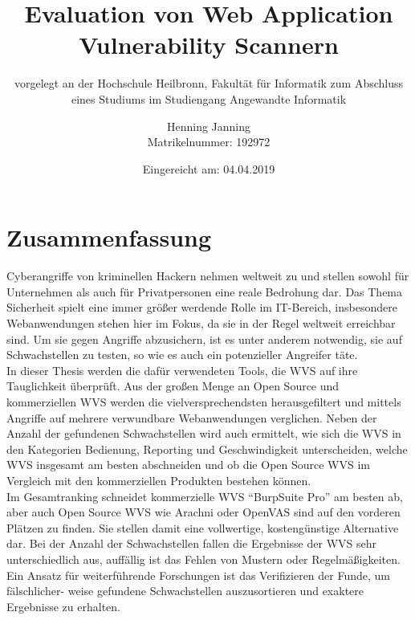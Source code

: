 \documentclass[12pt,oneside,a4paper,parskip,pointlessnumbers]{scrbook}
\def\BaAuthor{Henning Janning}
\def\BaTitle{Evaluation von Web Application Vulnerability Scannern}
\def\BaSupervisorOne{Prof. Dr.-Ing. Andreas Mayer}
\def\BaSupervisorTwo{Susanne Steuer, M.Sc.}
\def\BaDeadline{04.04.2019}
\def\MatNr{192972}
\begin{document}


\frontmatter
\titlehead{%
  {Hochschule Heilbronn\\
   Fakultät für Informatik}}
\subject{Bachelorarbeit}
\title{\BaTitle\\[15mm]}
\subtitle{\normalsize{vorgelegt an der Hochschule Heilbronn, Fakultät für Informatik zum Abschluss eines Studiums im Studiengang Angewandte Informatik}}
\author{\BaAuthor\\
\normalsize{Matrikelnummer: \MatNr}}
\bigskip
\date{\normalsize{Eingereicht am: \BaDeadline}}
\publishers{
  \normalsize{Erstpr\"{u}fer: \BaSupervisorOne}\\
  \normalsize{Zweitpr\"{u}ferin: \BaSupervisorTwo}\\
}


\maketitle



\section*{Zusammenfassung}
Cyberangriffe von kriminellen Hackern nehmen weltweit zu und stellen sowohl für Unternehmen als auch für Privatpersonen eine reale Bedrohung dar. Das Thema Sicherheit spielt eine immer größer werdende Rolle im IT-Bereich, insbesondere Webanwendungen stehen hier im Fokus, da sie in der Regel weltweit erreichbar sind. Um sie gegen Angriffe abzusichern, ist es unter anderem notwendig, sie auf Schwachstellen zu testen, so wie es auch ein potenzieller Angreifer täte.\\
In dieser Thesis werden die dafür verwendeten Tools, die \ac{WVS} auf ihre Tauglichkeit überprüft. Aus der großen Menge an Open Source und kommerziellen WVS werden die vielversprechendsten herausgefiltert und mittels Angriffe auf mehrere verwundbare Webanwendungen verglichen. Neben der Anzahl der gefundenen Schwachstellen wird auch ermittelt, wie sich die WVS in den Kategorien Bedienung, Reporting und Geschwindigkeit unterscheiden, welche WVS insgesamt am besten abschneiden und ob die Open Source WVS im Vergleich mit den kommerziellen Produkten bestehen können.\\
Im Gesamtranking schneidet kommerzielle WVS ``BurpSuite Pro'' am besten ab, aber auch Open Source WVS wie Arachni oder OpenVAS sind auf den vorderen Plätzen zu finden. Sie stellen damit eine vollwertige, kostengünstige Alternative dar. Bei der Anzahl der Schwachstellen fallen die Ergebnisse der WVS sehr unterschiedlich aus, auffällig ist das Fehlen von Mustern oder Regelmäßigkeiten.\\
Ein Ansatz für weiterführende Forschungen ist das Verifizieren der Funde, um fälschlicher- weise gefundene Schwachstellen auszusortieren und exaktere Ergebnisse zu erhalten.
\newpage
\end{document}
